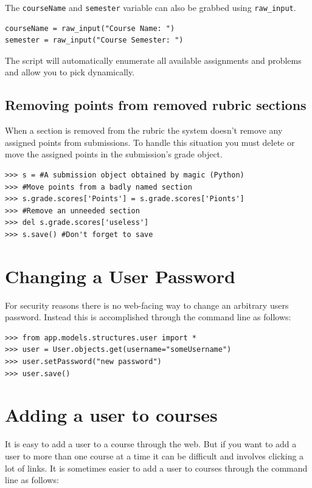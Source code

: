 \documentclass[11pt]{report}
\begin{document}
The \texttt{courseName} and \texttt{semester} variable can also be grabbed using 
\texttt{raw\_input}. 

\begin{verbatim}
courseName = raw_input("Course Name: ")
semester = raw_input("Course Semester: ")
\end{verbatim}

The script will automatically enumerate all available assignments and problems and allow you to pick 
dynamically.

\subsection{Removing points from removed rubric sections}
\label{sec:assigning_points:fixing_rubrics}
When a section is removed from the rubric the system doesn't remove any assigned points from submissions.
To handle this situation you must delete or move the assigned points in the submission's grade object.
\begin{verbatim}
>>> s = #A submission object obtained by magic (Python)
>>> #Move points from a badly named section
>>> s.grade.scores['Points'] = s.grade.scores['Pionts']
>>> #Remove an unneeded section
>>> del s.grade.scores['useless']
>>> s.save() #Don't forget to save
\end{verbatim}

\section{Changing a User Password}
For security reasons there is no web-facing way to change an arbitrary users password. Instead 
this is accomplished through the command line as follows:

\begin{verbatim}
>>> from app.models.structures.user import *
>>> user = User.objects.get(username="someUsername")
>>> user.setPassword("new password")
>>> user.save()
\end{verbatim}

\section{Adding a user to courses}
It is easy to add a user to a course through the web. But if you want to add a user to 
more than one course at a time it can be difficult and involves clicking a lot of links.
It is sometimes easier to add a user to courses through the command line as follows:
\end{document}
